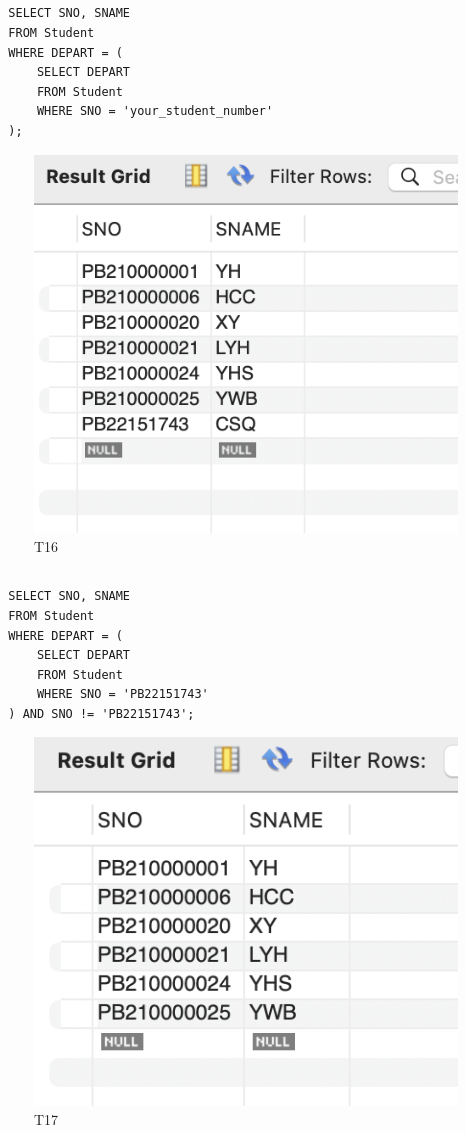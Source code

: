 \documentclass[UTF8]{ctexart}
\begin{document}
\subsection{}
\begin{lstlisting}
  SELECT SNO, SNAME
  FROM Student
  WHERE DEPART = (
      SELECT DEPART
      FROM Student
      WHERE SNO = 'your_student_number'
  );  
\end{lstlisting}
\begin{figure}[H]
  \centering
  \includegraphics[scale=0.7]{pics/16.png}
  \caption*{T16}
\end{figure}

\subsection{}
\begin{lstlisting}
  SELECT SNO, SNAME
  FROM Student
  WHERE DEPART = (
      SELECT DEPART
      FROM Student
      WHERE SNO = 'PB22151743'
  ) AND SNO != 'PB22151743';
\end{lstlisting}
\begin{figure}[H]
  \centering
  \includegraphics[scale=0.7]{pics/17.png}
  \caption*{T17}
\end{figure}
\end{document}
